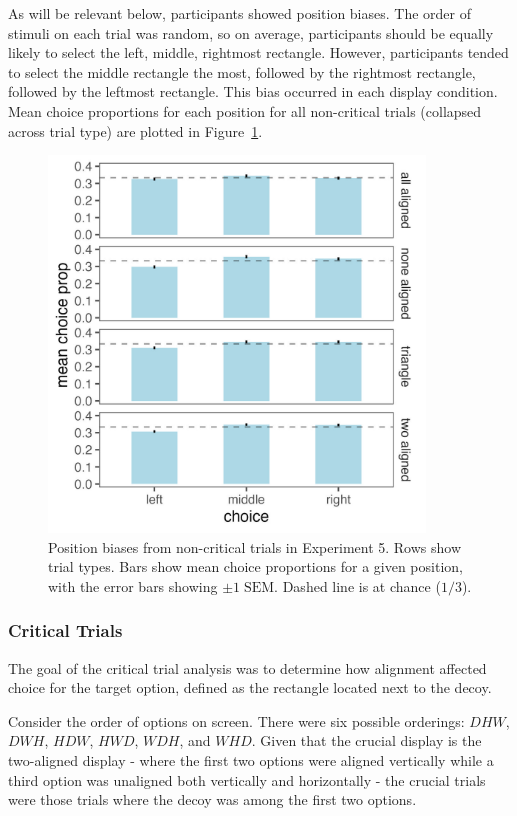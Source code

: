 As will be relevant below, participants showed position biases. The order of stimuli on each trial was random, so on average, participants should be equally likely to select the left, middle, rightmost rectangle. However, participants tended to select the middle rectangle the most, followed by the rightmost rectangle, followed by the leftmost rectangle. This bias occurred in each display condition. Mean choice proportions for each position for all non-critical trials (collapsed across trial type) are plotted in Figure~\ref{fig:comparability_pos_bias}.

\begin{figure}
   \centering
   \includegraphics[width=100mm]{figures/comparability_filler_position_bias.jpeg}
   \caption{Position biases from non-critical trials in Experiment 5. Rows show trial types. Bars show mean choice proportions for a given position, with the error bars showing $\pm1\;\text{SEM}$. Dashed line is at chance ($1/3$).}
   \label{fig:comparability_pos_bias}
\end{figure}


\subsubsection{Critical Trials}

The goal of the critical trial analysis was to determine how alignment affected choice for the target option, defined as the rectangle located next to the decoy.

Consider the order of options on screen. There were six possible orderings: $DHW$, $DWH$, $HDW$, $HWD$, $WDH$, and $WHD$. Given that the crucial display is the two-aligned display - where the first two options were aligned vertically while a third option was unaligned both vertically and horizontally - the crucial trials were those trials where the decoy was among the first two options. 

